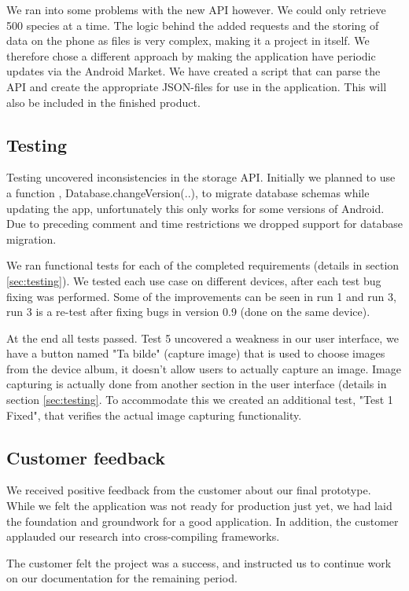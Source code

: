   We ran into some problems with the new API however. We could only retrieve 500
  species at a time. The logic behind the added requests and the storing of data
  on the phone as files is very complex, making it a project in itself. We
  therefore chose a different approach by making the application have periodic
  updates via the Android Market. We have created a script that can parse the
  API and create the appropriate JSON-files for use in the application. This
  will also be included in the finished product. 

\subsection{Testing}

Testing uncovered inconsistencies in the storage API. Initially we planned to
use a function , Database.changeVersion(..), to migrate database schemas while
updating the app, unfortunately this only works for some versions of Android.
Due to preceding comment and time restrictions we dropped support for database
migration.

We ran functional tests for each of the completed requirements (details in
section \ref{sec:testing}). We tested each use case on different devices, after
each test bug fixing was performed. Some of the improvements can be seen in run
1 and run 3, run 3 is a re-test after fixing bugs in version 0.9 (done on the
same device). 

At the end all tests passed. Test 5 uncovered a weakness in our user interface,
we have a button named "Ta bilde" (capture image) that is used to choose images
from the device album, it doesn't allow users to actually capture an image.
Image capturing is actually done from another section in the user interface
(details in section \ref{sec:testing}. To accommodate this we created an
additional test, "Test 1 Fixed", that verifies the actual image capturing
functionality.

\subsection{Customer feedback}
We received positive feedback from the customer about our final prototype. While
we felt the application was not ready for production just yet, we had laid the
foundation and groundwork for a good application. In addition, the customer
applauded our research into cross-compiling frameworks.

The customer felt the project was a success, and instructed us to continue work
on our documentation for the remaining period. 

